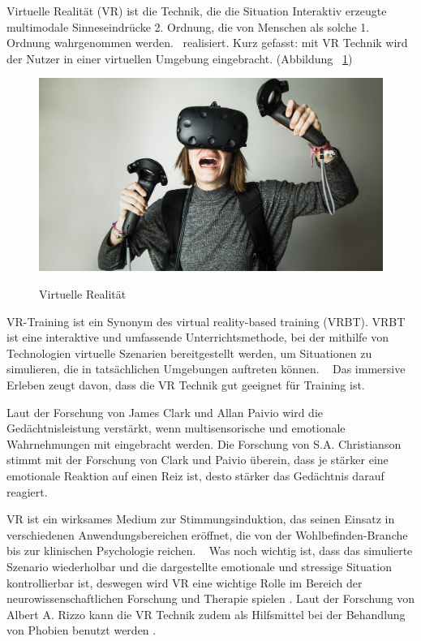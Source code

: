 Virtuelle Realität (VR) ist die Technik, die die Situation \glqq Interaktiv erzeugte multimodale Sinneseindrücke 2. Ordnung, die von Menschen als solche 1. Ordnung wahrgenommen werden.\grqq\ \citep{9} realisiert. Kurz gefasst: mit VR Technik wird der Nutzer in einer virtuellen Umgebung eingebracht. (Abbildung ~\ref{fig:vrhtcvive})


\begin{figure}[ht]
\vspace*{1em}
\centering
\caption{Virtuelle Realität}
\includegraphics[width=\textwidth]{images/vrhtcvive.jpg}
\label{fig:vrhtcvive} 
\end{figure}

VR-Training ist ein Synonym des virtual reality-based training (VRBT). \glqq VRBT ist eine interaktive und umfassende Unterrichtsmethode, bei der mithilfe von Technologien virtuelle Szenarien bereitgestellt werden, um Situationen zu simulieren, die in tatsächlichen Umgebungen auftreten können. \grqq\ \citep{14} 
Das immersive Erleben zeugt davon, dass die VR Technik gut geeignet für Training ist.

Laut der Forschung von James Clark und Allan Paivio \citep{10} wird die Gedächtnisleistung verstärkt, wenn multisensorische und emotionale Wahrnehmungen mit eingebracht werden. Die Forschung von S.A. Christianson \citep{11} stimmt mit der Forschung von Clark und Paivio überein, dass je stärker eine emotionale Reaktion auf einen Reiz ist, desto stärker das Gedächtnis darauf reagiert. 

\glqq VR ist ein wirksames Medium zur Stimmungsinduktion, das seinen Einsatz in verschiedenen Anwendungsbereichen eröffnet, die von der Wohlbefinden-Branche bis zur klinischen Psychologie reichen. \grqq\ \citep{29} Was noch wichtig ist, dass das simulierte Szenario wiederholbar und die dargestellte emotionale und stressige Situation kontrollierbar ist, deswegen wird VR eine wichtige Rolle im Bereich der neurowissenschaftlichen Forschung und Therapie spielen \citep{13}. Laut der Forschung von Albert A. Rizzo kann die VR Technik zudem als Hilfsmittel bei der Behandlung von Phobien benutzt werden \citep{12}. 

